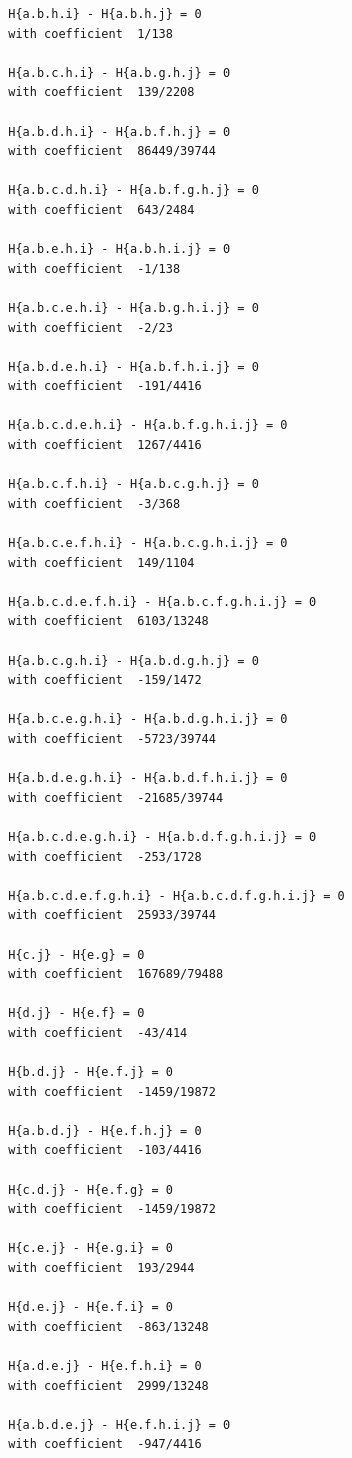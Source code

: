\documentclass[11pt, a4paper]{kybernetika}
\begin{document}
\begin{verbatim}
		H{a.b.h.i} - H{a.b.h.j} = 0
		with coefficient  1/138
		
		H{a.b.c.h.i} - H{a.b.g.h.j} = 0
		with coefficient  139/2208
		
		H{a.b.d.h.i} - H{a.b.f.h.j} = 0
		with coefficient  86449/39744
		
		H{a.b.c.d.h.i} - H{a.b.f.g.h.j} = 0
		with coefficient  643/2484
		
		H{a.b.e.h.i} - H{a.b.h.i.j} = 0
		with coefficient  -1/138
		
		H{a.b.c.e.h.i} - H{a.b.g.h.i.j} = 0
		with coefficient  -2/23
		
		H{a.b.d.e.h.i} - H{a.b.f.h.i.j} = 0
		with coefficient  -191/4416
		
		H{a.b.c.d.e.h.i} - H{a.b.f.g.h.i.j} = 0
		with coefficient  1267/4416
		
		H{a.b.c.f.h.i} - H{a.b.c.g.h.j} = 0
		with coefficient  -3/368
		
		H{a.b.c.e.f.h.i} - H{a.b.c.g.h.i.j} = 0
		with coefficient  149/1104
		
		H{a.b.c.d.e.f.h.i} - H{a.b.c.f.g.h.i.j} = 0
		with coefficient  6103/13248
		
		H{a.b.c.g.h.i} - H{a.b.d.g.h.j} = 0
		with coefficient  -159/1472
		
		H{a.b.c.e.g.h.i} - H{a.b.d.g.h.i.j} = 0
		with coefficient  -5723/39744
		
		H{a.b.d.e.g.h.i} - H{a.b.d.f.h.i.j} = 0
		with coefficient  -21685/39744
		
		H{a.b.c.d.e.g.h.i} - H{a.b.d.f.g.h.i.j} = 0
		with coefficient  -253/1728
		
		H{a.b.c.d.e.f.g.h.i} - H{a.b.c.d.f.g.h.i.j} = 0
		with coefficient  25933/39744
		
		H{c.j} - H{e.g} = 0
		with coefficient  167689/79488
		
		H{d.j} - H{e.f} = 0
		with coefficient  -43/414
		
		H{b.d.j} - H{e.f.j} = 0
		with coefficient  -1459/19872
		
		H{a.b.d.j} - H{e.f.h.j} = 0
		with coefficient  -103/4416
		
		H{c.d.j} - H{e.f.g} = 0
		with coefficient  -1459/19872
		
		H{c.e.j} - H{e.g.i} = 0
		with coefficient  193/2944
		
		H{d.e.j} - H{e.f.i} = 0
		with coefficient  -863/13248
		
		H{a.d.e.j} - H{e.f.h.i} = 0
		with coefficient  2999/13248
		
		H{a.b.d.e.j} - H{e.f.h.i.j} = 0
		with coefficient  -947/4416
		

\end{verbatim}
\end{document}
